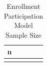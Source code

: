 \begin{table}
\centering
\caption{\label{tbl-selection-n}Enrollment Participation Model Sample Size}
\centering
\begin{tabular}[t]{l}
\toprule
n\\
\midrule
\cellcolor{gray!10}{127181}\\
\bottomrule
\end{tabular}
\end{table}
